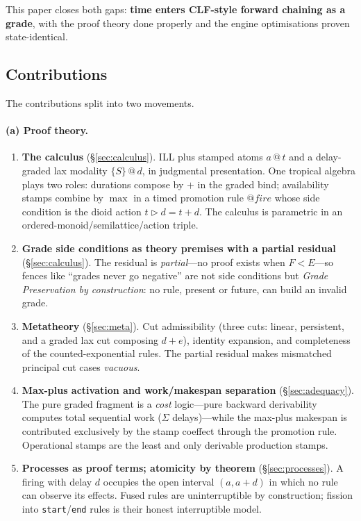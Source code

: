 \documentclass[11pt]{article}
\makeatletter
\newcommand{\lax}[2]{\{#1\}\mathbin{@}#2}       %
\newcommand{\act}{\mathbin{\rhd}}                %
\newcommand{\stmp}[2]{#1\mathbin{@}#2}           %
\theoremstyle{definition}
\theoremstyle{remark}
\makeatother
\begin{document}
This paper closes both gaps: \textbf{time enters CLF-style forward chaining as a
grade}, with the proof theory done properly and the engine optimisations proven
state-identical.

\subsection{Contributions}

The contributions split into two movements.

\paragraph{(a) Proof theory.}

\begin{enumerate}
\item \textbf{The calculus} (\S\ref{sec:calculus}).  ILL plus stamped atoms
  $\stmp{a}{t}$ and a delay-graded lax modality $\lax{S}{d}$, in judgmental
  presentation.  One tropical algebra plays two roles: durations compose by $+$
  in the graded bind; availability stamps combine by $\max$ in a timed promotion
  rule $\mathit{@fire}$ whose side condition is the dioid action $t \act d = t+d$.
  The calculus is parametric in an ordered-monoid/semilattice/action triple.

\item \textbf{Grade side conditions as theory premises with a partial residual}
  (\S\ref{sec:calculus}).  The residual is \emph{partial}---no proof exists when
  $F < E$---so fences like ``grades never go negative'' are not side conditions
  but \emph{Grade Preservation by construction}: no rule, present or future, can
  build an invalid grade.

\item \textbf{Metatheory} (\S\ref{sec:meta}).  Cut admissibility (three cuts:
  linear, persistent, and a graded lax cut composing $d+e$), identity expansion,
  and completeness of the counted-exponential rules.  The partial residual makes
  mismatched principal cut cases \emph{vacuous}.

\item \textbf{Max-plus activation and work/makespan separation}
  (\S\ref{sec:adequacy}).  The pure graded fragment is a \emph{cost} logic---pure
  backward derivability computes total sequential work ($\Sigma$ delays)---while
  the max-plus makespan is contributed exclusively by the stamp coeffect through
  the promotion rule.  Operational stamps are the least and only derivable
  production stamps.

\item \textbf{Processes as proof terms; atomicity by theorem} (\S\ref{sec:processes}).
  A firing with delay $d$ occupies the open interval $(a, a{+}d)$ in which no
  rule can observe its effects.  Fused rules are uninterruptible by construction;
  fission into \texttt{start}/\texttt{end} rules is their honest interruptible model.
\end{enumerate}
\end{document}
